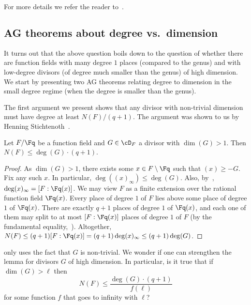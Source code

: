 For more details we refer the reader to~\cite[Chapter III]{S:93}.

\subsection{AG theorems about degree vs.\ dimension}

It turns out that the above question boils down to the question of
whether there are function fields with many degree $1$ places
(compared to the genus) and with low-degree divisors (of degree much
smaller than the genus) of high dimension. We start by presenting
two AG theorems relating degree to dimension in the small degree
regime (when the degree is smaller than the genus).

The first argument we present shows that any divisor with
non-trivial dimension must have degree at least $N(F)/(q+1)$. The
argument was shown to us by Henning Stichtenoth~\cite{S:09}.

\begin{lemma}
\label{lem:henning} Let $F/\Fq $ be a function field and $G \in
\cD_F$ a divisor with $\dim(G) > 1$. Then $N(F) \le \deg(G) \cdot
(q+1)$.
\end{lemma}

\begin{proof}
As $\dim(G) > 1$, there exists some $x \in F \setminus \Fq$ such
that $(x) \ge -G$. Fix any such $x$. In particular,
$\deg((x)_\infty) \le \deg(G)$. Also, by~\cite[Thm I.4.11]{S:93},
$\deg(x)_\infty=[F:\Fq (x)]$. We may view $F$ as a finite extension
over the rational function field $\Fq (x)$. Every place of degree
$1$ of $F$ lies above some place of degree $1$ of $\Fq (x)$. There
are exactly $q+1$ places of degree $1$ of $\Fq (x)$, and each one of
them may split to at most $[F:\Fq (x)]$ places of degree $1$ of $F$
(by the fundamental equality,~\cite[Thm III.1.11]{S:93}).
Altogether, $N(F) \le (q+1) [F:\Fq (x)] = (q+1) \deg(x)_\infty \le
(q+1) \deg(G)$.
\end{proof}

\begin{remark}
\label{rem:henning}  only uses the fact that
$G$ is non-trivial. We wonder if one can strengthen the lemma for
divisors $G$ of high dimension. In particular, is it true that if
$\dim(G) > \ell$ then
\[
N(F) \le \frac{\deg(G) \cdot (q+1)}{f(\ell)}
\]
for some function $f$ that goes to infinity with $\ell$?
\end{remark}

%
%
%
%
%

